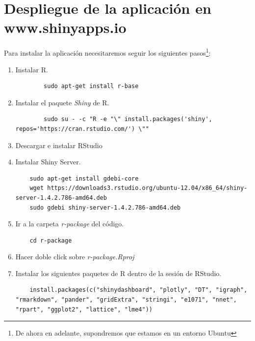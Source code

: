 \chapter[Despliegue de la aplicación]{Despliegue de la aplicación en www.shinyapps.io}

Para instalar la aplicación necesitaremos seguir los siguientes pasos\footnote{De ahora en adelante, supondremos que estamos en un entorno Ubuntu}:

\begin{enumerate}
	\item Instalar R.
	
	\begin{verbatim}
		sudo apt-get install r-base
	\end{verbatim}
	
	\item Instalar el paquete \textit{Shiny} de R.
	
	\begin{verbatim}
		sudo su - -c "R -e "\" install.packages('shiny', repos='https://cran.rstudio.com/') \""
	\end{verbatim}
	
	\item Descargar e instalar RStudio~\cite{RStudio}
	
	\item Instalar Shiny Server.
	
	\begin{verbatim}
	sudo apt-get install gdebi-core
	wget https://downloads3.rstudio.org/ubuntu-12.04/x86_64/shiny-server-1.4.2.786-amd64.deb
	sudo gdebi shiny-server-1.4.2.786-amd64.deb
	\end{verbatim}
	
	\item Ir a la carpeta \textit{r-package} del código. 
	
	\begin{verbatim}
	cd r-package
	\end{verbatim}
	
	\item Hacer doble click sobre \textit{r-package.Rproj}
	
	\item Instalar los siguientes paquetes de R dentro de la sesión de RStudio.
	
	\begin{verbatim}
	install.packages(c("shinydashboard", "plotly", "DT", "igraph", "rmarkdown", "pander", "gridExtra", "stringi", "e1071", "nnet", "rpart", "ggplot2", "lattice", "lme4"))
	\end{verbatim}
	

\end{enumerate}

